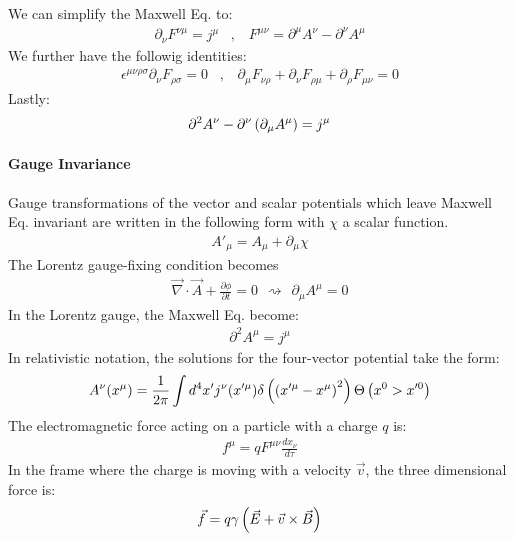 We can simplify the Maxwell Eq. to:
\begin{align*}
    \partial_\nu F^{\nu \mu} = j^\mu
    \hspace{10pt} , \hspace{10pt}
    F^{\mu \nu} = \partial^\mu A^\nu - \partial^\nu A^\mu
\end{align*}
We further have the followig identities:
\begin{align*}
    \epsilon^{\mu \nu \rho \sigma} \partial_\nu F_{\rho \sigma} = 0
    \hspace{10pt} , \hspace{10pt}
    \partial_\mu F_{\nu \rho} + \partial_\nu F_{\rho \mu} + \partial_\rho F_{\mu \nu} = 0
\end{align*}
Lastly:
\begin{align*}
    \partial^2 A^\nu - \partial^\nu \left( \partial_\mu A^\mu \right) = j^\mu
\end{align*}

\paragraph{Gauge Invariance}
Gauge transformations of the vector and scalar potentials which leave Maxwell
Eq. invariant are written in the following form with $\chi$ a scalar function.
\begin{align*}
    A'_\mu = A_\mu + \partial_\mu \chi
\end{align*}
The Lorentz gauge-fixing condition becomes
\begin{align*}
    \vec{\nabla} \cdot \vec{A} + \frac{\partial \phi}{\partial t} = 0
    \hspace{5pt} \rightsquigarrow \hspace{5pt}
    \partial_\mu A^\mu = 0
\end{align*}
In the Lorentz gauge, the Maxwell Eq. become:
\begin{align*}
    \partial^2 A^\mu = j^\mu
\end{align*}
In relativistic notation, the solutions for the four-vector potential take
the form:
\begin{align*}
    A^\nu (x^\mu) = \frac{1}{2 \pi} \int d^4 x' j^\nu (x'^\mu) \delta \left( \left( x'^\mu - x^\mu \right)^2 \right) \Theta \left( x^0 > x'^0 \right)
\end{align*}
The electromagnetic force acting on a particle with a charge $q$ is:
\begin{align*}
    f^\mu = q F^{\mu \nu} \frac{d x_\nu}{d \tau}
\end{align*}
In the frame where the charge is moving with a velocity $\vec{v}$, the three
dimensional force is:
\begin{align*}
    \vec{f} = q \gamma \left( \vec{E} + \vec{v} \times \vec{B} \right)
\end{align*}

